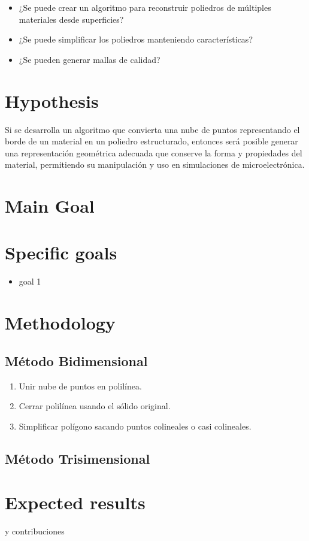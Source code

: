 \documentclass[submission]{eptcs}
\begin{document}
\begin{itemize}
    \item ¿Se puede crear un algoritmo para reconstruir poliedros de múltiples materiales desde superficies?
    \item ¿Se puede simplificar los poliedros manteniendo características?
    \item ¿Se pueden generar mallas de calidad?
\end{itemize}


\section{Hypothesis}

Si se desarrolla un algoritmo que convierta una nube de puntos representando el borde de un material en un poliedro estructurado, entonces será posible generar una representación geométrica adecuada que conserve la forma y propiedades del material, permitiendo su manipulación y uso en simulaciones de microelectrónica.

\section{Main Goal}


\section{Specific goals}

\begin{itemize}
\item goal 1
\end{itemize}

\section{Methodology}

\subsection{Método Bidimensional}
\begin{enumerate}
    \item Unir nube de puntos en polilínea.
    \item Cerrar polilínea usando el sólido original.
    \item Simplificar polígono sacando puntos colineales o casi colineales.
\end{enumerate}
\subsection{Método Trisimensional}

\section{Expected results}

 y contribuciones

\nocite{*}


\end{document}
